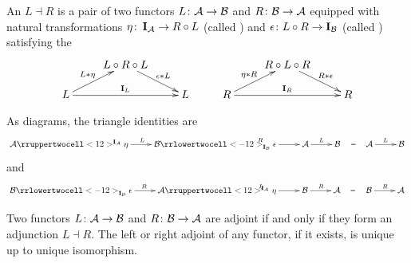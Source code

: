   \begin{defn}
    An  $L \dashv R$ is a pair of two functors $L\colon{\cal A}\to{\cal B}$ and $R\colon{\cal B}\to{\cal A}$ equipped with natural transformations $\eta\colon\operatorname{\mathbf{I}}_{{\cal A}} \to R \circ L$ (called ) and $\epsilon\colon L \circ R \to \operatorname{\mathbf{I}}_{{\cal B}}$ (called ) satisfying the 
    \begin{displaymath}
      \xymatrix@R=0.5cm{
        &L\circ R\circ L\ar[dr]^-{\epsilon\ast L}&&&R\circ L\circ R\ar[dr]^-{R\ast\epsilon}&\\
        L\ar[ur]^-{L\ast\eta}\ar[rr]^{\Id_L}&&L&R\ar[ur]^-{\eta\ast R}\ar[rr]^{\Id_R}&&R
        }
    \end{displaymath}
  \end{defn}
  \begin{rem}
    As diagrams, the triangle identities are
    \begin{displaymath}
      \xymatrix{
        \Aa\ar[r]^{L}\rruppertwocell<12>^{\Id_{\Aa}}_{}{\eta}&\Bb\ar[r]^{R}\rrlowertwocell<-12>^{}_{\Id_{\Bb}}{\epsilon}&\Aa\ar[r]^{L}&\Bb\ar@{}[r]|{=}&\Aa\ar[r]^{L}&\Bb
        }
    \end{displaymath}
    and
    \begin{displaymath}
      \xymatrix{
        \Bb\ar[r]^{R}\rrlowertwocell<-12>^{}_{\Id_{\Bb}}{\epsilon}&\Aa\ar[r]^{L}\rruppertwocell<12>^{\Id_{\Aa}}_{}{\eta}&\Bb\ar[r]^{R}&\Aa\ar@{}[r]|{=}&\Bb\ar[r]^{R}&\Aa
        }
    \end{displaymath}
  \end{rem}
  \begin{prop}
    Two functors $L\colon{\cal A}\to{\cal B}$ and $R\colon{\cal B}\to{\cal A}$ are adjoint if and only if they form an adjunction $L \dashv R$. The left or right adjoint of any functor, if it exists, is unique up to unique isomorphism.
  \end{prop}
